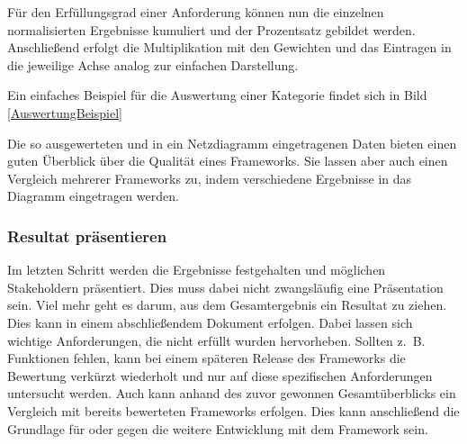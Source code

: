 Für den Erfüllungsgrad einer Anforderung können nun die einzelnen normalisierten Ergebnisse kumuliert und der Prozentsatz gebildet werden. Anschließend erfolgt die Multiplikation mit den Gewichten und das Eintragen in die jeweilige Achse analog zur einfachen Darstellung. 

Ein einfaches Beispiel für die Auswertung einer Kategorie findet sich in Bild \ref{AuswertungBeispiel}


Die so ausgewerteten und in ein Netzdiagramm eingetragenen Daten bieten einen guten Überblick über die Qualität eines Frameworks. Sie lassen aber auch einen Vergleich mehrerer Frameworks zu, indem verschiedene Ergebnisse in das Diagramm eingetragen werden.

\subsubsection{Resultat präsentieren}

Im letzten Schritt werden die Ergebnisse festgehalten und möglichen Stakeholdern präsentiert. Dies muss dabei nicht zwangsläufig eine Präsentation sein. Viel mehr geht es darum, aus dem Gesamtergebnis ein Resultat zu ziehen. Dies kann in einem abschließendem Dokument erfolgen. Dabei lassen sich wichtige Anforderungen, die nicht erfüllt wurden hervorheben. Sollten z.~B. Funktionen fehlen, kann bei einem späteren Release des Frameworks die Bewertung verkürzt wiederholt und nur auf diese spezifischen Anforderungen untersucht werden.
Auch kann anhand des zuvor gewonnen Gesamtüberblicks ein Vergleich mit bereits bewerteten Frameworks erfolgen. Dies kann anschließend die Grundlage für oder gegen die weitere Entwicklung mit dem Framework sein.

\pagebreak












